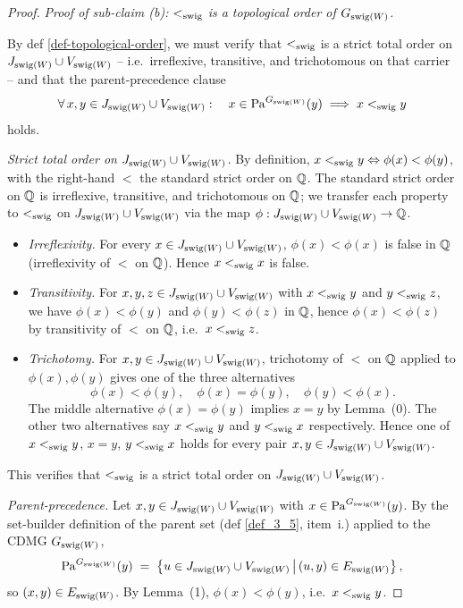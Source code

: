 \documentclass[main]{subfiles}
\begin{document}
\begin{proof}
\medskip\noindent\emph{Proof of sub-claim (b): $<_{\mathrm{swig}}$ is a topological order of $G_{\mathrm{swig}(W)}$.}

By def \ref{def-topological-order}, we must verify that $<_{\mathrm{swig}}$ is a strict total order on $J_{\mathrm{swig}(W)} \cup V_{\mathrm{swig}(W)}$ -- i.e.\ irreflexive, transitive, and trichotomous on that carrier -- and that the parent-precedence clause
\[
    \forall\, x, y \in J_{\mathrm{swig}(W)} \cup V_{\mathrm{swig}(W)} :\quad x \in \mathrm{Pa}^{G_{\mathrm{swig}(W)}}(y) \;\Longrightarrow\; x <_{\mathrm{swig}} y
\]
holds.

\emph{Strict total order on $J_{\mathrm{swig}(W)} \cup V_{\mathrm{swig}(W)}$.} By definition, $x <_{\mathrm{swig}} y \Leftrightarrow \phi(x) < \phi(y)$, with the right-hand $<$ the standard strict order on $\mathbb{Q}$. The standard strict order on $\mathbb{Q}$ is irreflexive, transitive, and trichotomous on $\mathbb{Q}$; we transfer each property to $<_{\mathrm{swig}}$ on $J_{\mathrm{swig}(W)} \cup V_{\mathrm{swig}(W)}$ via the map $\phi : J_{\mathrm{swig}(W)} \cup V_{\mathrm{swig}(W)} \to \mathbb{Q}$.
\begin{itemize}
    \item \emph{Irreflexivity.} For every $x \in J_{\mathrm{swig}(W)} \cup V_{\mathrm{swig}(W)}$, $\phi(x) < \phi(x)$ is false in $\mathbb{Q}$ (irreflexivity of $<$ on $\mathbb{Q}$). Hence $x <_{\mathrm{swig}} x$ is false.
    \item \emph{Transitivity.} For $x, y, z \in J_{\mathrm{swig}(W)} \cup V_{\mathrm{swig}(W)}$ with $x <_{\mathrm{swig}} y$ and $y <_{\mathrm{swig}} z$, we have $\phi(x) < \phi(y)$ and $\phi(y) < \phi(z)$ in $\mathbb{Q}$, hence $\phi(x) < \phi(z)$ by transitivity of $<$ on $\mathbb{Q}$, i.e.\ $x <_{\mathrm{swig}} z$.
    \item \emph{Trichotomy.} For $x, y \in J_{\mathrm{swig}(W)} \cup V_{\mathrm{swig}(W)}$, trichotomy of $<$ on $\mathbb{Q}$ applied to $\phi(x), \phi(y)$ gives one of the three alternatives
        \[
            \phi(x) < \phi(y), \quad \phi(x) = \phi(y), \quad \phi(y) < \phi(x).
        \]
        The middle alternative $\phi(x) = \phi(y)$ implies $x = y$ by Lemma~(0). The other two alternatives say $x <_{\mathrm{swig}} y$ and $y <_{\mathrm{swig}} x$ respectively. Hence one of $x <_{\mathrm{swig}} y$, $x = y$, $y <_{\mathrm{swig}} x$ holds for every pair $x, y \in J_{\mathrm{swig}(W)} \cup V_{\mathrm{swig}(W)}$.
\end{itemize}
This verifies that $<_{\mathrm{swig}}$ is a strict total order on $J_{\mathrm{swig}(W)} \cup V_{\mathrm{swig}(W)}$.

\emph{Parent-precedence.} Let $x, y \in J_{\mathrm{swig}(W)} \cup V_{\mathrm{swig}(W)}$ with $x \in \mathrm{Pa}^{G_{\mathrm{swig}(W)}}(y)$. By the set-builder definition of the parent set (def \ref{def_3_5}, item~i.) applied to the CDMG $G_{\mathrm{swig}(W)}$,
\[
    \mathrm{Pa}^{G_{\mathrm{swig}(W)}}(y) \;=\; \left \{ u \in J_{\mathrm{swig}(W)} \cup V_{\mathrm{swig}(W)} \,\big|\, (u, y) \in E_{\mathrm{swig}(W)} \right \},
\]
so $(x, y) \in E_{\mathrm{swig}(W)}$. By Lemma~(1), $\phi(x) < \phi(y)$, i.e.\ $x <_{\mathrm{swig}} y$.


\end{proof}
\end{document}
